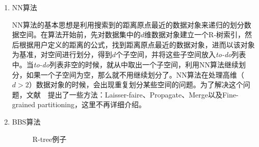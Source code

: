 \begin{enumerate}
  \item NN算法

  NN算法的基本思想是利用搜索到的距离原点最近的数据对象来递归的划分数据空间。在算法开始前，先对数据集中的$d$维数据对象建立一个R-树索引，然后根据用户定义的距离的公式，找到距离原点最近的数据对象，进而以该对象为基准，对空间进行划分，得到$d$个子空间，并将这些子空间放入\emph{to-do}列表中。当\emph{to-do}列表非空的时候，就从中取出一个子空间，利用NN算法继续划分，如果一个子空间为空，那么就不用继续划分了。NN算法在处理高维（$d > 2$）数据对象的时候，会出现重复划分某些空间的问题。为了解决这个问题，文献~\cite{kossmann2002shooting}~提出了一些方法：Laisser-faire、Propagate、Merge以及Fine-grained partitioning，这里不再详细介绍。

  \item BBS算法
  \begin{figure}
  \begin{minipage}[b]{1\linewidth}
    \centering
    \hspace{0.05in}
    \caption{R-tree例子}
    \label{F:Fig_SkyRtree}
  \end{minipage}%
  \end{figure}


\end{enumerate}
